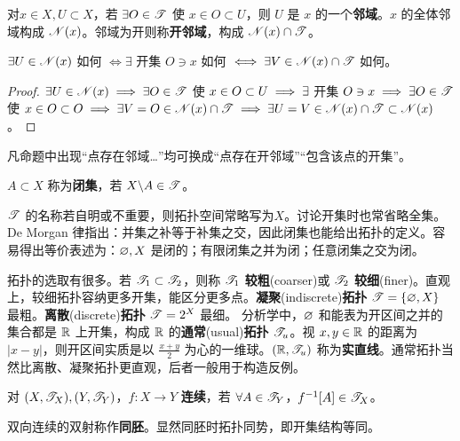 \begin{definition}
    对$x\in X,U\subset X$，若 $\exists O\in\mathscr{T}$ 使 $x\in O\subset U$，则 $U$ 是 $x$ 的一个\textbf{邻域}。$x$ 的全体邻域构成 $\mathscr N(x)$。邻域为开则称\textbf{开邻域}，构成 $\mathscr N(x)\cap\mathscr T$。
\end{definition}

\begin{theorem}
    $\exists U \in\mathscr N(x)$ 如何 $\iff \exists$ 开集 $O\ni x$ 如何 $\iff \exists V \in\mathscr N(x)\cap\mathscr T$ 如何。
\end{theorem}
\begin{proof}
    $\exists U\in\mathscr N(x)\implies \exists O\in\mathscr T$ 使 $x\in O\subset U\implies \exists$ 开集 $O\ni x\implies\exists O\in\mathscr T$ 使 $x\in O\subset O\implies \exists V=O \in\mathscr N(x)\cap\mathscr T\implies\exists U=V\in\mathscr N(x)\cap\mathscr T\subset\mathscr N(x)$。
\end{proof}
\begin{remark}
    凡命题中出现“点存在邻域…”均可换成“点存在开邻域”“包含该点的开集”。
\end{remark}

\begin{definition}
    $A\subset X$ 称为\textbf{闭集}，若 $X\backslash A\in\mathscr{T}$。
\end{definition}

$\mathscr T$ 的名称若自明或不重要，则拓扑空间常略写为$X$。讨论开集时也常省略全集。De Morgan 律指出：并集之补等于补集之交，因此闭集也能给出拓扑的定义。容易得出等价表述为：$\varnothing,X$ 是闭的；有限闭集之并为闭；任意闭集之交为闭。

拓扑的选取有很多。若 $\mathscr T_1\subset\mathscr T_2$，则称 $\mathscr T_1$ \textbf{较粗}(coarser)或 $\mathscr T_2$ \textbf{较细}(finer)。直观上，较细拓扑容纳更多开集，能区分更多点。\textbf{凝聚}(indiscrete)\textbf{拓扑} $\mathscr T=\{\varnothing,X\}$ 最粗。\textbf{离散}(discrete)\textbf{拓扑} $\mathscr T= 2^X$ 最细。
分析学中，$\varnothing$ 和能表为开区间之并的集合都是 $\mathbb{R}$ 上开集，构成 $\mathbb{R}$ 的\textbf{通常}(usual)\textbf{拓扑} $\mathscr T_u$。视 $x,y\in\mathbb{R}$ 的距离为 $|x-y|$，则开区间实质是以 $\frac{x+y}{2}$ 为心的一维球。$(\mathbb{R},\mathscr T_u)$ 称为\textbf{实直线}。通常拓扑当然比离散、凝聚拓扑更直观，后者一般用于构造反例。

\begin{definition}
    对 $(X,\mathscr T_X),(Y,\mathscr T_Y)$，$f: X \to Y$ \textbf{连续}，若 $\forall A\in\mathscr T_Y$，$f^{-1}[A]\in \mathscr T_X$。
\end{definition}

\begin{definition}
    双向连续的双射称作\textbf{同胚}。显然同胚时拓扑同势，即开集结构等同。
\end{definition}

